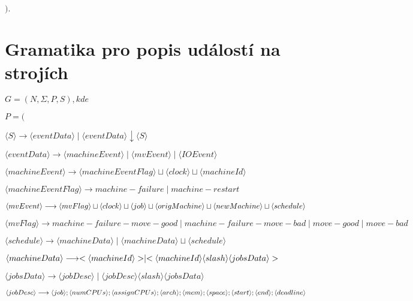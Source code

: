 \documentclass[final]{fithesis}
\begin{document}
\begin{list}{}{$).$}
	\item
\end{list}

\section{Gramatika pro popis událostí na strojích}
$G = (N, \Sigma, P, S), kde$

\begin{list}{}{$P = ($}
	\item $\langle S \rangle 
		\longrightarrow 
		\langle eventData \rangle \mid \langle eventData \rangle \downarrow \langle S \rangle$
	\item $\langle eventData \rangle 
		\longrightarrow 
		\langle machineEvent \rangle \mid \langle mvEvent \rangle \mid \langle IOEvent \rangle$
	\item $\langle machineEvent \rangle 
		\longrightarrow 
		\langle machineEventFlag \rangle \sqcup \langle clock \rangle \sqcup \langle machineId \rangle$
	\item $\langle machineEventFlag \rangle 
		\longrightarrow 
		machine-failure \mid machine-restart$
	\item $\langle mvEvent \rangle 
		\longrightarrow 
		\langle mvFlag \rangle \sqcup \langle clock \rangle \sqcup \langle job \rangle \sqcup \langle origMachine \rangle \sqcup \\ \langle newMachine \rangle \sqcup \langle schedule \rangle$
	\item $\langle mvFlag \rangle 
		\longrightarrow 
		machine-failure-move-good \mid machine-failure-move-bad \mid move-good \mid move-bad$
	\item $\langle schedule \rangle 
		\longrightarrow 
		\langle machineData \rangle \mid \langle machineData \rangle \sqcup \langle schedule \rangle$
	\item $\langle machineData \rangle 
		\longrightarrow 
		< \langle machineId \rangle > \mid < \langle machineId \rangle \langle slash \rangle \\ \langle jobsData \rangle >$
	\item $\langle jobsData \rangle 
		\longrightarrow 
		\langle jobDesc \rangle \mid \langle jobDesc \rangle \langle slash \rangle \langle jobsData \rangle$
	\item $\langle jobDesc \rangle 
		\longrightarrow 
		\langle job \rangle ; \langle numCPUs \rangle ; \langle assignCPUs \rangle ; \langle arch \rangle ; \langle mem \rangle ;\\ \langle space \rangle ; \langle start \rangle ; \langle end \rangle ; \langle deadline \rangle$

\end{list}
\end{document}
